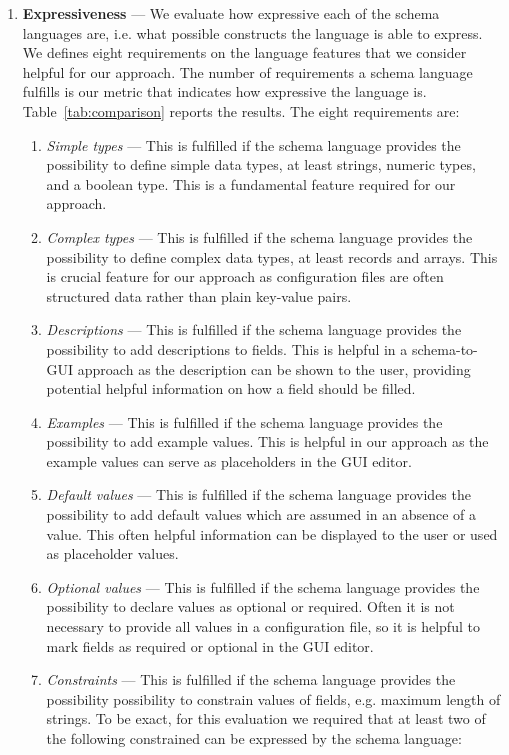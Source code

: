 \documentclass[lettersize,journal]{IEEEtran}
\begin{document}
\begin{enumerate}
    \item \textbf{Expressiveness} --- We evaluate how expressive each of the schema languages are, i.e. what possible constructs the language is able to express. We defines eight requirements on the language features that we consider helpful for our approach. The number of requirements a schema language fulfills is our metric that indicates how expressive the language is. Table~\ref{tab:comparison} reports the results. The eight requirements are:
    \begin{enumerate}
        \item \textit{Simple types} --- This is fulfilled if the schema language provides the possibility to define simple data types, at least strings, numeric types, and a boolean type. This is a fundamental feature required for our approach.
        \item \textit{Complex types} --- This is fulfilled if the schema language provides the possibility to define complex data types, at least records and arrays.
        This is crucial feature for our approach as configuration files are often structured data rather than plain key-value pairs.
        \item \textit{Descriptions} --- This is fulfilled if the schema language provides the possibility to add descriptions to fields. This is helpful in a schema-to-GUI approach as the description can be shown to the user, providing potential helpful information on how a field should be filled.
        \item \textit{Examples} --- This is fulfilled if the schema language provides the possibility to add example values. This is helpful in our approach as the example values can serve as placeholders in the GUI editor.
        \item \textit{Default values} --- This is fulfilled if the schema language provides the possibility to add default values which are assumed in an absence of a value. This often helpful information can be displayed to the user or used as placeholder values.
        \item \textit{Optional values} --- This is fulfilled if the schema language provides the possibility to declare values as optional or required. Often it is not necessary to provide all values in a configuration file, so it is helpful to mark fields as required or optional in the GUI editor.
        \item \textit{Constraints} --- This is fulfilled if the schema language provides the possibility possibility to constrain values of fields, e.g. maximum length of strings. To be exact, for this evaluation we required that at least two of the following constrained can be expressed by the schema language:

\end{enumerate}
\end{enumerate}
\end{document}

